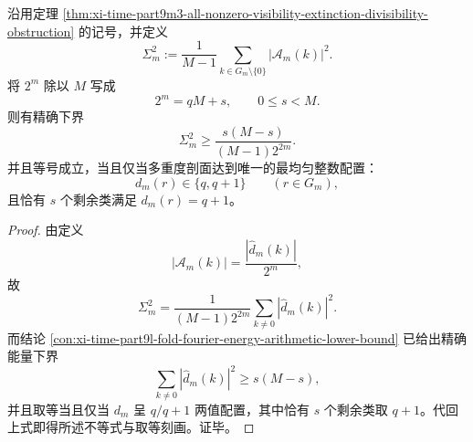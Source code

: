 \begin{theorem}[归一化均方可见度的算术下界]\label{thm:xi-time-part9m3-mean-square-visibility-arithmetic-floor}
沿用定理 \ref{thm:xi-time-part9m3-all-nonzero-visibility-extinction-divisibility-obstruction} 的记号，并定义
\[
\Sigma_m^2
:=
\frac{1}{M-1}\sum_{k\in G_m\setminus\{0\}}|\mathcal A_m(k)|^2.
\]
将 \(2^m\) 除以 \(M\) 写成
\[
2^m=qM+s,
\qquad
0\le s<M.
\]
则有精确下界
\[
\Sigma_m^2\ge \frac{s(M-s)}{(M-1)2^{2m}}.
\]
并且等号成立，当且仅当多重度剖面达到唯一的最均匀整数配置：
\[
d_m(r)\in\{q,q+1\}
\qquad
(r\in G_m),
\]
且恰有 \(s\) 个剩余类满足 \(d_m(r)=q+1\)。
\end{theorem}
\begin{proof}
由定义
\[
|\mathcal A_m(k)|=\frac{|\widehat d_m(k)|}{2^m},
\]
故
\[
\Sigma_m^2
=
\frac{1}{(M-1)2^{2m}}\sum_{k\ne 0}|\widehat d_m(k)|^2.
\]
而结论 \ref{con:xi-time-part9l-fold-fourier-energy-arithmetic-lower-bound} 已给出精确能量下界
\[
\sum_{k\ne 0}|\widehat d_m(k)|^2\ge s(M-s),
\]
并且取等当且仅当 \(d_m\) 呈 \(q/q+1\) 两值配置，其中恰有 \(s\) 个剩余类取 \(q+1\)。代回上式即得所述不等式与取等刻画。证毕。
\end{proof}

